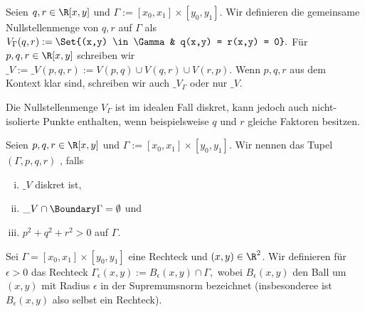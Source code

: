 \documentclass{mythesis}
\begin{document}
\begin{definition}
    Seien $q, r \in \R[x,y]$ und $\Gamma := [x_0, x_1] \times [y_0, y_1]$.
    Wir definieren die gemeinsame Nullstellenmenge von $q, r$ auf $\Gamma$ als
    \begin{math}
        V_\Gamma(q,r) :=
        \Set{(x,y) \in \Gamma & q(x,y) = r(x,y) = 0}.
    \end{math}
    Für $p, q, r \in \R[x,y]$ schreiben wir
    \begin{math}
        \_V := \_V(p,q,r) := V(p,q) \cup V(q,r) \cup V(r,p).
    \end{math}
    Wenn $p, q, r$ aus dem Kontext klar sind, schreiben wir auch $\_V_\Gamma$ oder nur $\_V$.
\end{definition}

Die Nullstellenmenge $V_\Gamma$ ist im idealen Fall diskret, kann jedoch auch nicht-isolierte Punkte enthalten, wenn beispielsweise $q$ und $r$ gleiche Faktoren besitzen.

\begin{definition}
    Seien $p, q, r \in \R[x,y]$ und $\Gamma := [x_0, x_1] \times [y_0, y_1]$.
    Wir nennen das Tupel $(\Gamma, p, q, r)$ , falls
    \begin{enumerate}[i)]
        \item
            $\_V$ diskret ist,
        \item
            $\_V \cap \Boundary \Gamma = \emptyset$ und
        \item
            $p^2 + q^2 + r^2 > 0$ auf $\Gamma$.
    \end{enumerate}
\end{definition}

\begin{definition} \label{thm:def:gamma2_eps}
    Sei $\Gamma = [x_0,x_1] \times [y_0, y_1]$ eine Rechteck und $(x,y) \in \R^2$.
    Wir definieren für $\epsilon > 0$ das Rechteck
    \begin{math}
        \Gamma_\epsilon(x,y) := B_\epsilon(x,y) \cap \Gamma,
    \end{math}
    wobei $B_\epsilon(x,y)$ den Ball um $(x,y)$ mit Radius $\epsilon$ in der Supremumsnorm bezeichnet (insbesonderee ist $B_\epsilon(x,y)$ also selbst ein Rechteck).
\end{definition}
\end{document}
